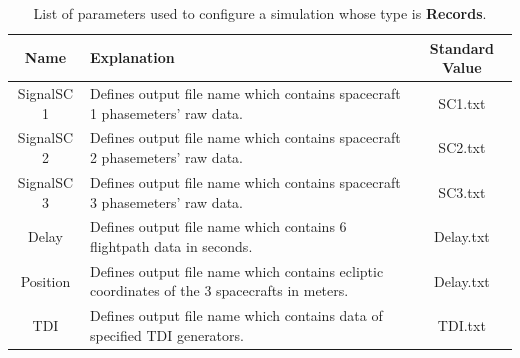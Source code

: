 \documentclass[a4paper,english,12pt]{article}
\begin{document}
\begin{table}[p]
\caption{List of parameters used to configure a simulation whose type is  \textbf{Records}. }
\begin{center} 
\begin{tabular}{|c|p{}|c|} 
\hline 
 Name & Explanation &  Standard Value  \\ 
\hline
 SignalSC 1& Defines output file name which contains spacecraft 1 phasemeters' raw data.  &  SC1.txt \\ 
\hline
 SignalSC 2& Defines output file name which contains spacecraft 2 phasemeters' raw data.  &  SC2.txt \\
\hline
SignalSC 3& Defines output file name which contains spacecraft 3 phasemeters' raw data.  &  SC3.txt \\ 
\hline
Delay & Defines output file name which contains 6 flightpath data in seconds.  &  Delay.txt \\ 
\hline
Position & Defines output file name which contains ecliptic coordinates of the 3 spacecrafts in meters.  &  Delay.txt \\ 
\hline
TDI & Defines output file name which contains data of specified TDI generators.  &  TDI.txt \\ 
\hline 
\end{tabular} 
\end{center} 
\label{table_paramRecord} 
\end{table}
\end{document}
